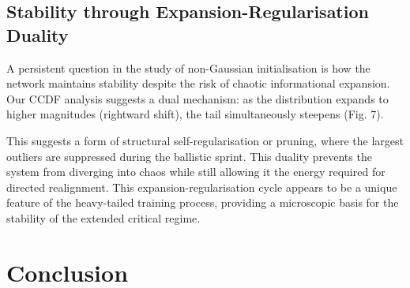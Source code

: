 \documentclass[11pt,a4paper]{article}
\begin{document}
\subsection{Stability through Expansion-Regularisation Duality}

A persistent question in the study of non-Gaussian initialisation is how the network maintains stability despite the risk of chaotic informational expansion. Our CCDF analysis suggests a dual mechanism: as the distribution expands to higher magnitudes (rightward shift), the tail simultaneously steepens (Fig. 7).

This suggests a form of structural self-regularisation or pruning, where the largest outliers are suppressed during the ballistic sprint. This duality prevents the system from diverging into chaos while still allowing it the energy required for directed realignment. This expansion-regularisation cycle appears to be a unique feature of the heavy-tailed training process, providing a microscopic basis for the stability of the extended critical regime.
\section{Conclusion}
\end{document}
